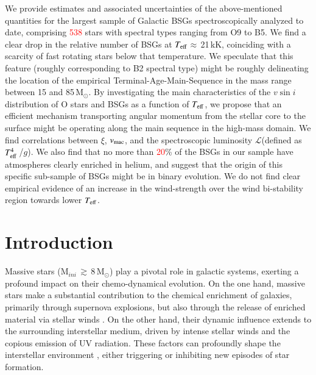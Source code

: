\documentclass{aa}
\newcommand{\vsini}{\mbox{$v\sin i$}\xspace}
\newcommand{\vmac} {$v_{\rm mac}$\xspace}
\newcommand{\vmic}{$\xi$\xspace}
\newcommand{\Teff}{\mbox{$T_{\rm eff}$}\xspace}
\newcommand{\Ls}{$ \mathcal{L}$\xspace}
\newcommand{\MSol}{\,\mbox{M$_\odot$}\xspace}
\newcommand{\num}[1]{\textcolor{red}{#1}}
\newcommand{\gs}{\mbox{$\gtrsim$}\,}
\begin{document}
{We provide estimates and associated uncertainties of the above-mentioned quantities for the largest sample of Galactic BSGs spectroscopically analyzed to date, comprising \num{538} stars with spectral types ranging from O9 to B5. 
We find a clear drop in the relative number of BSGs at \Teff$\approx$\,21\,kK, coinciding with a scarcity of fast rotating stars below that temperature. We speculate that this feature (roughly corresponding to B2 spectral type) might be roughly delineating the location of the empirical Terminal-Age-Main-Sequence in the mass range between 15 and 85\MSol.
By investigating the main characteristics of the \vsini distribution of O stars and BSGs as a function of \Teff, we propose that an efficient mechanism transporting angular momentum from the stellar core to the surface might be operating along the main sequence in the high-mass domain.
We find correlations between \vmic, \vmac, and the spectroscopic luminosity \Ls (defined as $T_{\rm eff}^4$\,/$g$). We also find that no more than \num{20}\% of the BSGs in our sample have atmospheres clearly enriched in helium, and suggest that the origin of this specific sub-sample of BSGs might be in binary evolution. 
We do not find clear empirical evidence of an increase in the wind-strength over the wind bi-stability region towards lower \Teff.
}
%
{}

%
\maketitle



\section{Introduction}
\label{section:1_tmp}

Massive stars (M$_{ini}$\,$\gs$8\MSol) play a pivotal role in galactic systems, exerting a profound impact on their chemo-dynamical evolution. On the one hand, massive stars make a substantial contribution to the chemical enrichment of galaxies, primarily through supernova explosions, but also through the release of enriched material via stellar winds \citep[e.g.][]{maeder81, woosley95, kaufer97, nomoto13}. On the other hand, their dynamic influence extends to the surrounding interstellar medium, driven by intense stellar winds and the copious emission of UV radiation. These factors can profoundly shape the interstellar environment \citep[e.g.][]{krause13, watkins19, kim19, geen21}, either triggering or inhibiting new episodes of star formation.
\end{document}
